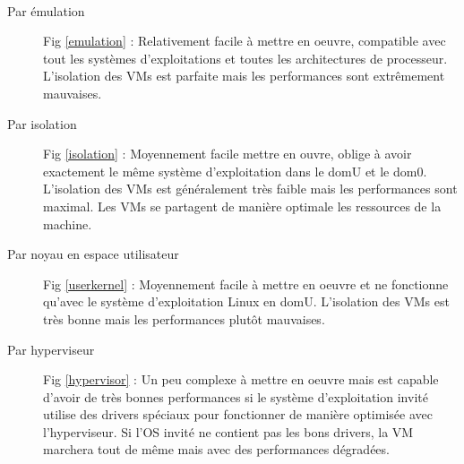 \paragraph*{}
\begin{description}

	\item[Par émulation] Fig \ref{emulation} : Relativement facile à mettre en oeuvre, compatible avec tout les systèmes d'exploitations et toutes les architectures
	de processeur. L'isolation des VMs est parfaite mais les performances sont extrêmement mauvaises.

	\item[Par isolation] Fig \ref{isolation} : Moyennement facile mettre en ouvre, oblige à avoir exactement le même système d'exploitation dans le domU et le dom0.
	L'isolation des VMs est généralement très faible mais les performances sont maximal. Les VMs se partagent de manière optimale les ressources de la machine.

	\item[Par noyau en espace utilisateur] Fig \ref{userkernel} : Moyennement facile à mettre en oeuvre et ne fonctionne qu'avec le système d'exploitation Linux en domU.
	L'isolation des VMs est très bonne mais les performances plutôt mauvaises.

	\item[Par hyperviseur] Fig \ref{hypervisor} : Un peu complexe à mettre en oeuvre mais est capable d'avoir de très bonnes performances si le système d'exploitation invité
	utilise des drivers spéciaux pour fonctionner de manière optimisée avec l'hyperviseur. Si l'OS invité ne contient pas les bons drivers, la VM marchera tout de même mais
	avec des performances dégradées.

\end{description}

